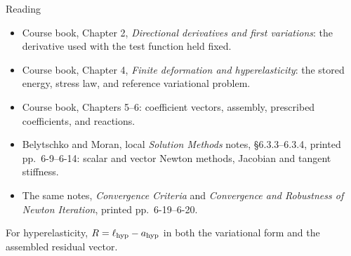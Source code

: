 \documentclass[11pt,aspectratio=169]{beamer}
\begin{document}
\begin{frame}{Reading}
\begin{itemize}
\item Course book, Chapter 2, \emph{Directional derivatives and first variations}:
the derivative used with the test function held fixed.
\item Course book, Chapter 4, \emph{Finite deformation and hyperelasticity}:
the stored energy, stress law, and reference variational problem.
\item Course book, Chapters 5--6: coefficient vectors, assembly,
prescribed coefficients, and reactions.
\item Belytschko and Moran, local \emph{Solution Methods} notes,
\S6.3.3--6.3.4, printed pp.\ 6-9--6-14: scalar and vector Newton methods,
Jacobian and tangent stiffness.
\item The same notes, \emph{Convergence Criteria} and
\emph{Convergence and Robustness of Newton Iteration},
printed pp.\ 6-19--6-20.
\end{itemize}
For hyperelasticity, $R=\ell_{\rm hyp}-a_{\rm hyp}$ in both the variational
form and the assembled residual vector.
\end{frame}
\end{document}
